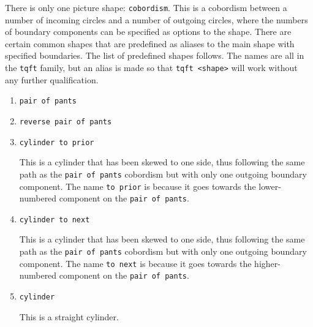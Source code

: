 \documentclass{ltxdoc}
\begin{document}
There is only one picture shape: \Verb+cobordism+.
This is a cobordism between a number of incoming circles and a number of outgoing circles, where the numbers of boundary components can be specified as options to the shape.
There are certain common shapes that are predefined as aliases to the main shape with specified boundaries.
The list of predefined shapes follows.
The names are all in the \Verb+tqft+ family, but an alias is made so that \Verb+tqft <shape>+ will work without any further qualification.

\begin{enumerate}
\item \Verb+pair of pants+


\item \Verb+reverse pair of pants+


\item \Verb+cylinder to prior+

This is a cylinder that has been skewed to one side, thus following the same path as the \Verb+pair of pants+ cobordism but with only one outgoing boundary component.
The name \Verb+to prior+ is because it goes towards the lower-numbered component on the \Verb+pair of pants+. 


\item \Verb+cylinder to next+

This is a cylinder that has been skewed to one side, thus following the same path as the \Verb+pair of pants+ cobordism but with only one outgoing boundary component.
The name \Verb+to next+ is because it goes towards the higher-numbered component on the \Verb+pair of pants+. 


\item \Verb+cylinder+

This is a straight cylinder.


\end{enumerate}
\end{document}
